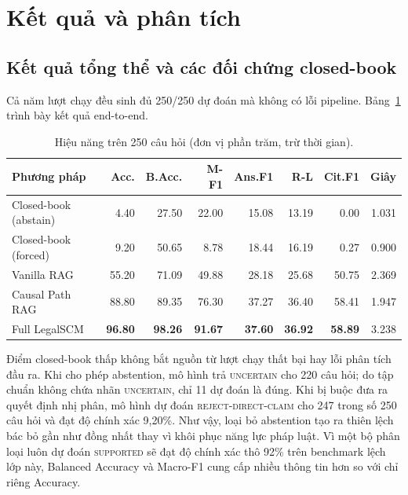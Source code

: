 \section{Kết quả và phân tích}
\label{sec:results_analysis}

\subsection{Kết quả tổng thể và các đối chứng closed-book}

Cả năm lượt chạy đều sinh đủ 250/250 dự đoán mà không có lỗi pipeline.
Bảng~\ref{tab:main_results} trình bày kết quả end-to-end.

\begin{table}[t]
\centering
\caption{Hiệu năng trên 250 câu hỏi (đơn vị phần trăm, trừ thời gian).}
\label{tab:main_results}
\scriptsize
\setlength{\tabcolsep}{1.35pt}
\begin{tabular}{@{}lrrrrrrr@{}}
\toprule
\textbf{Phương pháp}
& \textbf{Acc.}
& \textbf{B.Acc.}
& \textbf{M-F1}
& \textbf{Ans.F1}
& \textbf{R-L}
& \textbf{Cit.F1}
& \textbf{Giây}\\
\midrule
Closed-book (abstain) & 4.40 & 27.50 & 22.00 & 15.08 & 13.19 & 0.00 & 1.031\\
Closed-book (forced) & 9.20 & 50.65 & 8.78 & 18.44 & 16.19 & 0.27 & 0.900\\
Vanilla RAG & 55.20 & 71.09 & 49.88 & 28.18 & 25.68 & 50.75 & 2.369\\
Causal Path RAG & 88.80 & 89.35 & 76.30 & 37.27 & 36.40 & 58.41 & 1.947\\
Full LegalSCM & \textbf{96.80} & \textbf{98.26} & \textbf{91.67}
& \textbf{37.60} & \textbf{36.92} & \textbf{58.89} & 3.238\\
\bottomrule
\end{tabular}
\end{table}

Điểm closed-book thấp không bắt nguồn từ lượt chạy thất bại hay lỗi phân tích
đầu ra. Khi cho phép abstention, mô hình trả \textsc{uncertain} cho 220 câu
hỏi; do tập chuẩn không chứa nhãn \textsc{uncertain}, chỉ 11 dự đoán là đúng.
Khi bị buộc đưa ra quyết định nhị phân, mô hình dự đoán
\textsc{reject-direct-claim} cho 247 trong số 250 câu hỏi và đạt độ chính xác
9,20\%. Như vậy, loại bỏ abstention tạo ra thiên lệch bác bỏ gần như đồng nhất
thay vì khôi phục năng lực pháp luật. Vì một bộ phân loại luôn dự đoán
\textsc{supported} sẽ đạt độ chính xác thô 92\% trên benchmark lệch lớp này,
Balanced Accuracy và Macro-F1 cung cấp nhiều thông tin hơn so với chỉ riêng
Accuracy.

